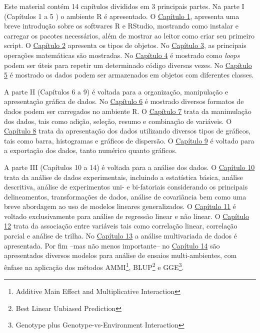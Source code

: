 \documentclass[
]{book}
\numberwithin{equation}{section}
\begin{document}
Este material contém 14 capítulos divididos em 3 principais partes. Na parte I (Capítulos 1 a 5 ) o ambiente R é apresentado. O \protect\hyperlink{intro}{Capítulo 1}, apresenta uma breve introdução sobre os softwares R e RStudio, mostrando como instalar e carregar os pacotes necessários, além de mostrar ao leitor como criar seu primeiro script. O \protect\hyperlink{objects}{Capítulo 2} apresenta os tipos de objetos. No \protect\hyperlink{math}{Capítulo 3}, as principais operações matemáticas são mostradas. No \protect\hyperlink{loops}{Capítulo 4} é mostrado como \emph{loops} podem ser úteis para repetir um determinado código diversas vezes. No \protect\hyperlink{dataframe}{Capítulo 5} é mostrado os dados podem ser armazenados em objetos com diferentes classes.

A parte II (Capítulos 6 a 9) é voltada para a organização, manipulação e apresentação gráfica de dados. No \protect\hyperlink{entrada}{Capítulo 6} é mostrado diversos formatos de dados podem ser carregados no ambiente R. O \protect\hyperlink{manipula}{Capítulo 7} trata da manimulação dos dados, tais como adição, seleção, resumo e combinação de variáveis. O \protect\hyperlink{graph}{Capítulo 8} trata da apresentação dos dados utilizando diversos tipos de gráficos, tais como barra, histogramas e gráficos de dispersão. O \protect\hyperlink{exporta}{Capítulo 9} é voltado para a exportação dos dados, tanto numérico quanto gráficos.

A parte III (Capítulos 10 a 14) é voltada para a análise dos dados. O \protect\hyperlink{analdata}{Capítulo 10} trata da análise de dados experimentais, incluindo a estatística básica, análise descritiva, análise de experimentos uni- e bi-fatoriais considerando os principais delineamentos, transformações de dados, análise de covariância bem como uma breve abordagem ao uso de modelos lineares generalizados. O \protect\hyperlink{reg}{Capítulo 11} é voltado exclusivamente para análise de regressão linear e não linear. O \protect\hyperlink{relations}{Capítulo 12} trata da associação entre variáveis tais como correlação linear, correlação parcial e análise de trilha. No \protect\hyperlink{multivariate}{Capítulo 13} a análise multivariada de dados é apresentada. Por fim --mas não menos importante-- no \protect\hyperlink{interaction}{Capítulo 14} são apresentados diversos modelos para análise de ensaios multi-ambientes, com ênfase na aplicação dos métodos AMMI\footnote{Additive Main Effect and Multiplicative Interaction}, BLUP\footnote{Best Linear Unbiased Prediction} e GGE\footnote{Genotype plus Genotype-vs-Environment Interaction}.
\end{document}
